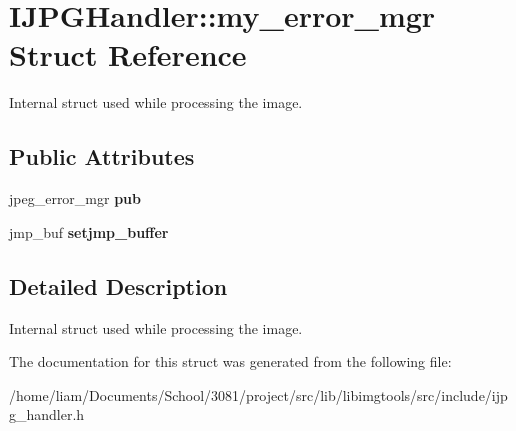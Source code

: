 \hypertarget{structIJPGHandler_1_1my__error__mgr}{}\section{I\+J\+P\+G\+Handler\+:\+:my\+\_\+error\+\_\+mgr Struct Reference}
\label{structIJPGHandler_1_1my__error__mgr}


Internal struct used while processing the image.  


\subsection*{Public Attributes}
\begin{DoxyCompactItemize}
\item 
jpeg\+\_\+error\+\_\+mgr {\bfseries pub}\hypertarget{structIJPGHandler_1_1my__error__mgr_a4becae11e4e057a483048273c8c7f47c}{}\label{structIJPGHandler_1_1my__error__mgr_a4becae11e4e057a483048273c8c7f47c}

\item 
jmp\+\_\+buf {\bfseries setjmp\+\_\+buffer}\hypertarget{structIJPGHandler_1_1my__error__mgr_a0e0f24e082823cb706400cc3e967dce4}{}\label{structIJPGHandler_1_1my__error__mgr_a0e0f24e082823cb706400cc3e967dce4}

\end{DoxyCompactItemize}


\subsection{Detailed Description}
Internal struct used while processing the image. 

The documentation for this struct was generated from the following file\+:\begin{DoxyCompactItemize}
\item 
/home/liam/\+Documents/\+School/3081/project/src/lib/libimgtools/src/include/ijpg\+\_\+handler.\+h\end{DoxyCompactItemize}
